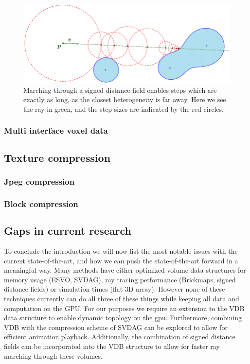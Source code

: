 \begin{figure}[H]
    \centering
    \includegraphics[width=0.9\linewidth]{figures/sdf_ray_marching.png}
    \caption{Marching through a signed distance field enables steps which are exactly as long, as the closest heterogeneity is far away. Here we see the ray in green, and the step sizes are indicated by the red circles. \cite{SDF_sphere_marching}}
    \label{fig:SDF_marching}
\end{figure}
\subsubsection{Multi interface voxel data} \label{introduction:attribute_separation:multi_interface_voxel_data}





\subsection{Texture compression} \label{introduction:texture_compression}
\subsubsection{Jpeg compression} \label{introduction:texture_compression:jpeg_compression}
\subsubsection{Block compression} \label{introduction:texture_compression:block_compression}






\subsection{Gaps in current research} \label{introduction:gaps_in_current_research}
To conclude the introduction we will now list the most notable issues with the current state-of-the-art, and how we can push the state-of-the-art forward in a meaningful way. Many methods have either optimized volume data structures for memory usage (ESVO, SVDAG), ray tracing performance (Brickmaps, signed distance fields) or simulation times (flat 3D array). However none of these techniques currently can do all three of these things while keeping all data and computation on the GPU. For our purposes we require an extension to the VDB data structure to enable dynamic topology on the gpu. Furthermore, combining VDB with the compression scheme of SVDAG can be explored to allow for efficient animation playback. Additionally, the combination of signed distance fields can be incorporated into the VDB structure to allow for faster ray marching through these volumes.

